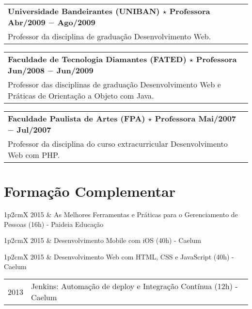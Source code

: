 \documentclass[a4paper, oneside, final]{scrartcl}
\newcommand{\vspc}{\vspace{0.15cm}} %
\newcommand{\vspcitem}{\vspace{0.1cm}} %
\begin{document}
\begin{center}
\begin{tabularx}{1\linewidth}{X}
{\bf Universidade Bandeirantes (UNIBAN) $\star$ Professora \hfill Abr/2009 $-$ Ago/2009} \\
Professor da disciplina de graduação Desenvolvimento Web. \vspc\\
\end{tabularx}

\begin{tabularx}{1\linewidth}{X}
{\bf Faculdade de Tecnologia Diamantes (FATED) $\star$ Professora \hfill Jun/2008 $-$ Jun/2009} \\
Professor das disciplinas de graduação Desenvolvimento Web e Práticas de Orientação a Objeto com Java. \vspc\\
\end{tabularx}

\begin{tabularx}{1\linewidth}{X}
{\bf Faculdade Paulista de Artes (FPA) $\star$ Professora  \hfill Mai/2007 $-$ Jul/2007} \\
Professor da disciplina do curso extracurricular Desenvolvimento Web com PHP. \vspc\\
\end{tabularx}

\section{Formação Complementar}
\begin{tabularx}{1\linewidth}{p{2cm}X}
2015       &  As Melhores Ferramentas e Práticas para o Gerenciamento de Pessoas (16h) - Paideia Educação \vspcitem\\
\end{tabularx}

\begin{tabularx}{1\linewidth}{p{2cm}X}
2015       & Desenvolvimento Mobile com iOS (40h) - Caelum \vspcitem\\
\end{tabularx}

\begin{tabularx}{1\linewidth}{p{2cm}X}
2015       & Desenvolvimento Web com HTML, CSS e JavaScript (40h) - Caelum \vspcitem\\
\end{tabularx}

\begin{tabularx}{1\linewidth}{p{2cm}X}
2013       & Jenkins: Automação de deploy e Integração Contínua (12h) - Caelum \vspcitem\\
\end{tabularx}


\end{center}
\end{document}
